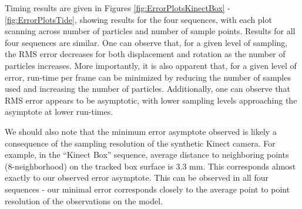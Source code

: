 Timing results are given in Figures \ref{fig:ErrorPlotsKinectBox} -\ref{fig:ErrorPlotsTide}, showing results for the four sequences, with each plot scanning across number of particles and number of sample points. Results for all four sequences are similar. One can observe that, for a given level of sampling, the RMS error decreases for both displacement and rotation as the number of particles increases. More importantly, it is also apparent that, for a given level of error, run-time per frame can be minimized by reducing the number of samples used and increasing the number of particles. Additionally, one can observe that RMS error appears to be asymptotic, with lower sampling levels approaching the asymptote at lower run-times.

We should also note that the minimum error asymptote observed is likely a consequence of the sampling resolution of the synthetic Kinect camera. For example, in the ``Kinect Box'' sequence, average distance to neighboring points (8-neighborhood) on the tracked box surface is 3.3 mm. This corresponds almost exactly to our observed error asymptote. This can be observed in all four sequences - our minimal error corresponds closely to the average point to point resolution of the observations on the model. 




